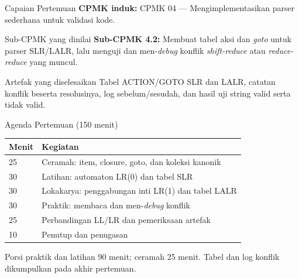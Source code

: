\documentclass[aspectratio=169,10pt,t]{beamer}
\begin{document}

\begin{frame}{Capaian Pertemuan}
  \textbf{CPMK induk:} CPMK 04 --- Mengimplementasikan parser sederhana
  untuk validasi kode.

  \vspace{3pt}
  \begin{block}{Sub-CPMK yang dinilai}
    \small
    \textbf{Sub-CPMK 4.2:} Membuat tabel aksi dan \textit{goto} untuk
    parser SLR/LALR, lalu menguji dan men-\textit{debug} konflik
    \textit{shift-reduce} atau \textit{reduce-reduce} yang muncul.
  \end{block}

  \vspace{3pt}
  \begin{exampleblock}{Artefak yang diselesaikan}
    \footnotesize
    Tabel ACTION/GOTO SLR dan LALR, catatan konflik beserta
    resolusinya, log sebelum/sesudah, dan hasil uji string valid serta
    tidak valid.
  \end{exampleblock}
\end{frame}

\begin{frame}{Agenda Pertemuan (150 menit)}
  \small
  \begin{tabular}{@{}p{1.4cm}p{12.3cm}@{}}
    \toprule
    \textbf{Menit} & \textbf{Kegiatan} \\
    \midrule
    25 & Ceramah: item, closure, goto, dan koleksi kanonik \\
    30 & Latihan: automaton LR(0) dan tabel SLR \\
    30 & Lokakarya: penggabungan inti LR(1) dan tabel LALR \\
    30 & Praktik: membaca dan men-\textit{debug} konflik \\
    25 & Perbandingan LL/LR dan pemeriksaan artefak \\
    10 & Penutup dan penugasan \\
    \bottomrule
  \end{tabular}

  \vspace{6pt}
  {\scriptsize\color{ubbblue!75}Porsi praktik dan latihan 90 menit;
  ceramah 25 menit. Tabel dan log konflik dikumpulkan pada akhir
  pertemuan.}
\end{frame}
\end{document}

